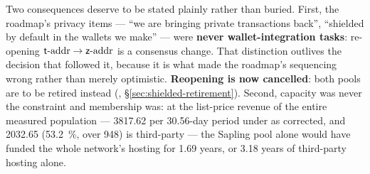 Two consequences deserve to be stated plainly rather than buried. First, the roadmap's privacy items
--- ``we are bringing private transactions back'', ``shielded by default in the wallets we make'' ---
were \textbf{never wallet-integration tasks}: re-opening $\mathsf{t}\text{-addr} \to \mathsf{z}\text{-addr}$ is a consensus change.
That distinction outlives the decision that followed it, because it is what made the roadmap's
sequencing wrong rather than merely optimistic. \textbf{Reopening is now cancelled}: both pools are
to be retired instead  (\planned,
\S\ref{sec:shielded-retirement}). Second, capacity was never the constraint and membership was: at
the list-price revenue of the entire measured population --- \num{3817.62}\flux{} per
\num{30.56}-day period under  as corrected,  and
\num{2032.65}\flux{} (\SI{53.2}{\percent}, over \num{948}) is third-party
 --- the Sapling pool alone would have funded the whole
network's hosting for \num{1.69} years, or \num{3.18} years of third-party hosting alone.

